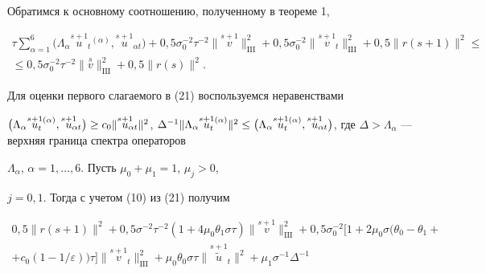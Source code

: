 \begin{pf}


Обратимся к основному соотношению, полученному в теореме 1,


\begin{multline}


\tau\sum_{\alpha=1}^6\bigl(\Lambda_\alpha\overset{s+1}{u}_{\!\!\!t}{}^


{(\alpha)},\overset{s+1}{u}_{\!\!\!\alpha t}\bigr)+


0,5\sigma_0^{-2}\tau^{-2}\|\overset{s+1}{v}\big\|_{\mathrm{III}}^2+


0,5\sigma_0^{-2}\|\overset{s+1}{v}_{\!\!\!t}\big\|_{\mathrm{III}}^2+


0,5\|r(s+1)\|^2\leq \\


%


\leq 0,5\sigma_0^{-2}\tau^{-2}


\|\overset{s}{v}\big\|_{\mathrm{III}}^2+0,5\|r(s)\|^2.


\end{multline}


Для оценки первого слагаемого в (21) воспользуемся неравенствами


$\bigl(\Lambda_\alpha\ussat,\overset{s+1}{u}_{\!\!\!\alpha t}\bigr)\geq


c_0\|\overset{s+1}{u}_{\!\!\!\alpha t}\|^2$, $\Delta^{-1}\|\Lambda_\alpha


\ussat\|^2\leq \bigl(\Lambda_\alpha\ussat,\overset{s+1}{u}_{\!\!\!\alpha t}


\bigr)$, где $\Delta>\Lambda_\alpha$ --- верхняя граница спектра операторов


$\Lambda_\alpha$, $\alpha=1,\dotsc,6$. Пусть $\mu_0+\mu_1=1$, $\mu_j>0$,


$j=0,1$. Тогда с учетом (10) из (21) получим


\begin{multline}


0,5\|r(s+1)\|^2+0,5\sigma^{-2}\tau^{-2}(1+4\mu_0\theta_1\sigma\tau)


\|\overset{s+1}{v}\big\|_{\mathrm{III}}^2+0,5\sigma_0^{-2}


\big[1+2\mu_0\sigma\big(\theta_0-\theta_1+ \\


%


+c_0(1-1/\varepsilon)\big)\tau\big]\|\overset{s+1}{v}_{\!\!\!t}


\big\|_{\mathrm{III}}^2+\mu_0\theta_0\sigma


\tau\|\overset{s+1}{\tilde u}_{\!\!\!t}\|^2+\mu_1\sigma^{-1}\Delta^{-1}



\end{multline}
\end{pf}
